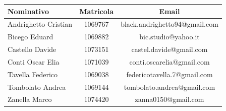 \documentclass[PianoProgetto.tex]{subfiles}
\begin{document}
\begin{appendices}
\begin{table}[h]
		\begin{tabularx}{\textwidth}{lc C}
			\toprule
			\textbf{Nominativo} & \textbf{Matricola} & \textbf{Email} \\
			\midrule
			Andrighetto Cristian & 1069767 & black.andrighetto94@gmail.com \\
			Bicego Eduard & 1069882 & bic.studio@yahoo.it  \\
			Castello Davide	& 1073151 &	 castel.davide@gmail.com\\
			Conti Oscar Elia & 1071039 & conti.oscarelia@gmail.com \\
			Tavella Federico & 1069038 & federicotavella.7@gmail.com\\
			Tombolato Andrea & 1069144 & tombolato.andrea@gmail.com	 \\
			Zanella Marco & 1074420 & zanna0150@gmail.com \\
			\bottomrule
		\end{tabularx}
		
		\end{table}		
\vfill			
\end{appendices}
\end{document}
